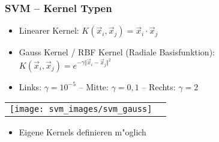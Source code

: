 
\begin{frame}

\frametitle{SVM -- Kernel Typen}

\begin{itemize}
	\setlength{\itemsep}{10pt}
	\item Linearer Kernel: $K(\vec{x}_i,\vec{x}_j)= \vec{x}_i \cdot \vec{x}_j$
	\item Gauss Kernel / RBF Kernel (Radiale Basisfunktion): $K(\vec{x}_i,\vec{x}_j)= e^{-\gamma \Vert \vec{x}_i-\vec{x}_j \Vert^2}$
\end{itemize}

\vspace{10pt}

\begin{itemize}
	\setlength{\itemsep}{10pt}
	\item Links: $\gamma=10^{-5}$ \quad -- \quad Mitte: $\gamma=0,1$ \quad -- \quad Rechts: $\gamma=2$
\end{itemize}

\center
\begin{tabular}[h]{cl}
\texttt{[image: svm\_images/svm\_gauss]} &  {\tiny \cite{svmsuccinctly}}
\end{tabular}

\begin{itemize}
	\setlength{\itemsep}{10pt}
	\item Eigene Kernels definieren m"oglich
\end{itemize}

\end{frame}






